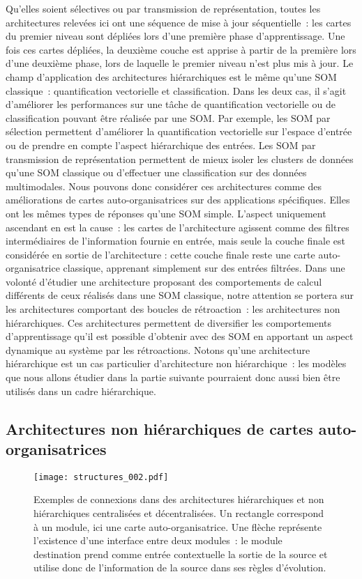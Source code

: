 \documentclass[../main]{subfiles}
\begin{document}
Qu'elles soient sélectives ou par transmission de représentation, toutes les architectures relevées ici ont une séquence de mise à jour séquentielle~: les cartes du premier niveau sont dépliées lors d'une première phase d'apprentissage. Une fois ces cartes dépliées, la deuxième couche est apprise à partir de la première lors d'une deuxième phase, lors de laquelle le premier niveau n'est plus mis à jour.
Le champ d'application des architectures hiérarchiques est le même qu'une SOM classique~: quantification vectorielle et classification.
Dans les deux cas, il s'agit d'améliorer les performances sur une tâche de quantification vectorielle ou de classification pouvant être réalisée par une SOM. 
Par exemple, les SOM par sélection permettent d'améliorer la quantification vectorielle sur l'espace d'entrée ou de prendre en compte l'aspect hiérarchique des entrées. Les SOM par transmission de représentation permettent de mieux isoler les clusters de données qu'une SOM classique ou d'effectuer une classification sur des données multimodales.
Nous pouvons donc considérer ces architectures comme des améliorations de cartes auto-organisatrices sur des applications spécifiques.
Elles ont les mêmes types de réponses qu'une SOM simple.
L'aspect uniquement ascendant en est la cause~: les cartes de l'architecture agissent comme des filtres intermédiaires de l'information fournie en entrée, mais seule la couche finale est considérée en sortie de l'architecture : cette couche finale reste une carte auto-organisatrice classique, apprenant simplement sur des entrées filtrées.
Dans une volonté d'étudier une architecture proposant des comportements de calcul différents de ceux réalisés dans une SOM classique, notre attention se portera sur les architectures comportant des boucles de rétroaction~: les architectures non hiérarchiques.
Ces architectures permettent de diversifier les comportements d'apprentissage qu'il est possible d'obtenir avec des SOM en apportant un aspect dynamique au système par les rétroactions. 
Notons qu'une architecture hiérarchique est un cas particulier d'architecture non hiérarchique~: les modèles que nous allons étudier dans la partie suivante pourraient donc aussi bien être utilisés dans un cadre hiérarchique.


\subsection{Architectures non hiérarchiques de cartes auto-organisatrices}

\begin{figure}
    \centering\texttt{[image: structures\_002.pdf]}
    \caption{Exemples de connexions dans des architectures hiérarchiques et non hiérarchiques centralisées et décentralisées. Un rectangle correspond à un module, ici une carte auto-organisatrice. Une flèche représente l'existence d'une interface entre deux modules~: le module destination prend comme entrée contextuelle la sortie de la source et utilise donc de l'information de la source dans ses règles d'évolution. \label{fig:structure}}
    \end{figure}
\end{document}
